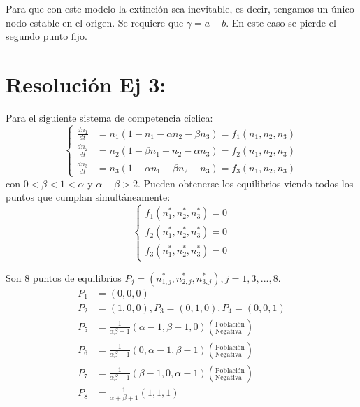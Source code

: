\documentclass[twocolumn,aps,prl]{revtex4-1}
\newcommand{\nstar}{n^*}
\begin{document}
Para que con este modelo la extinción sea inevitable, es decir, tengamos un único nodo estable en el origen. Se requiere que $\gamma = a-b$. En este caso se pierde el segundo punto fijo.

% 
%                                 
% 

\section{Resolución Ej 3:}

Para el siguiente sistema de competencia cíclica:
$$
\left\{
\begin{aligned}
\frac{d n_{1}}{d t}&=n_{1}\left(1-n_{1}-\alpha n_{2}-\beta n_{3}\right) = f_1(n_1,n_2,n_3)\\
\frac{d n_{2}}{d t}&=n_{2}\left(1-\beta n_{1}-n_{2}-\alpha n_{3}\right) = f_2(n_1,n_2,n_3) \\
\frac{d n_{3}}{d t}&=n_{3}\left(1-\alpha n_{1}-\beta n_{2}-n_{3}\right) = f_3(n_1,n_2,n_3)
\end{aligned}
\right.
$$
con $0<\beta<1<\alpha$ y $\alpha+\beta>2$. Pueden obtenerse los  equilibrios viendo todos los puntos que cumplan simultáneamente: 
$$\left\lbrace
\begin{aligned}
    f_1(\nstar_1,\nstar_2,\nstar_3) = 0\\ 
    f_2(\nstar_1,\nstar_2,\nstar_3) = 0\\ 
    f_3(\nstar_1,\nstar_2,\nstar_3) = 0   
\end{aligned}\right.
$$


Son 8 puntos de equilibrios $P_j = (\nstar_{1,j},\nstar_{2,j},\nstar_{3,j}), j= 1, 3, ..., 8$.
$$
\begin{aligned}
    P_1 &= (0, 0, 0) \\ 
    P_2 &= (1, 0, 0), P_3 = (0, 1, 0), P_4 = (0, 0, 1) \\
    P_5 &= \frac{1}{\alpha \beta - 1} 
                       (\alpha - 1, \beta - 1 , 0)  \left(^\text{Población}_\text{Negativa} \right)  \\ 
    P_6 &= \frac{1}{\alpha \beta - 1} 
                       (0         , \alpha - 1, \beta - 1)  \left(^\text{Población}_\text{Negativa} \right)  \\ 
    P_7 &= \frac{1}{\alpha \beta - 1} 
                       (\beta - 1 , 0         , \alpha - 1)  \left(^\text{Población}_\text{Negativa} \right)  \\ 
    P_8 &= \frac{1}{\alpha + \beta + 1}(1, 1, 1) 
\end{aligned}
$$
\end{document}
